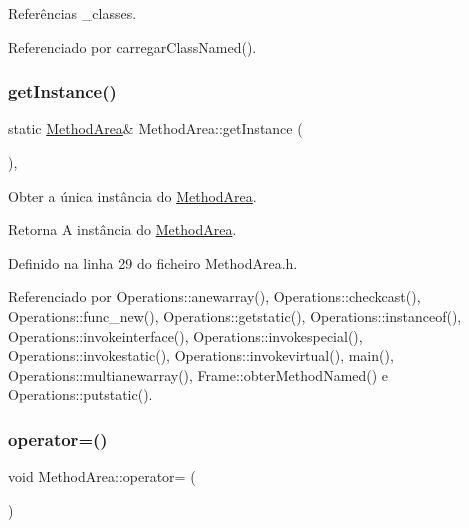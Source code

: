 Referências \+\_\+classes.



Referenciado por carregar\+Class\+Named().

\mbox{\label{classMethodArea_ab5fadec94ada20bc6381e7e9ac766cad}} 
\subsubsection{\texorpdfstring{get\+Instance()}{getInstance()}}
{\footnotesize\ttfamily static \hyperlink{classMethodArea}{Method\+Area}\& Method\+Area\+::get\+Instance (\begin{DoxyParamCaption}{ }\end{DoxyParamCaption})\hspace{0.3cm}{\ttfamily [inline]}, {\ttfamily [static]}}



Obter a única instância do \hyperlink{classMethodArea}{Method\+Area}. 

\begin{DoxyReturn}{Retorna}
A instância do \hyperlink{classMethodArea}{Method\+Area}. 
\end{DoxyReturn}


Definido na linha 29 do ficheiro Method\+Area.\+h.



Referenciado por Operations\+::anewarray(), Operations\+::checkcast(), Operations\+::func\+\_\+new(), Operations\+::getstatic(), Operations\+::instanceof(), Operations\+::invokeinterface(), Operations\+::invokespecial(), Operations\+::invokestatic(), Operations\+::invokevirtual(), main(), Operations\+::multianewarray(), Frame\+::obter\+Method\+Named() e Operations\+::putstatic().

\mbox{\label{classMethodArea_a02652b16a9bc28ceae405a9959cf4ee8}} 
\subsubsection{\texorpdfstring{operator=()}{operator=()}}
{\footnotesize\ttfamily void Method\+Area\+::operator= (\begin{DoxyParamCaption}\item[{\hyperlink{classMethodArea}{Method\+Area} const \&}]{ }\end{DoxyParamCaption})\hspace{0.3cm}{\ttfamily [private]}}



